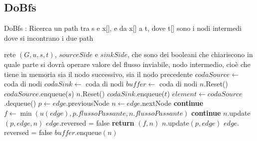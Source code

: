 \documentclass{article}
\begin{document}
\subsection{DoBfs}
\begin{algorithm}
    \caption{DoBfs : Ricerca un path tra s e x[], e da x[] a t, dove t[] sono i nodi intermedi dove si incontrano i due path}
    \begin{algorithmic}[1]
        \REQUIRE rete $(G,u,s,t)$, $sourceSide$ e $sinkSide$, che sono dei booleani che chiariscono in quale parte si dovrà operare
        \ENSURE valore del flusso inviabile, nodo intermedio, cioè che tiene in memoria sia il nodo successivo, sia il nodo precedente
        \STATE $codaSource \leftarrow$ coda di nodi
        \STATE $codaSink \leftarrow$ coda di nodi
        \STATE $buffer \leftarrow$ coda di nodi
        \STATE $n.$Reset()
        \ENDFOR
        \STATE $codaSource.$enqueue($s$)
        \ENDIF
        \STATE $n.$Reset()
        \ENDFOR
        \STATE $codaSink$.enqueue($t$)
        \ENDIF
        \STATE{}
        \STATE $element \leftarrow codaSource$.dequeue()
        \STATE $p \leftarrow edge.$previousNode
        \STATE $n \leftarrow edge.$nextNode
        \STATE \textbf{continue}
        \ELSE
        \STATE $f \leftarrow \min(u(edge),p.flussoPassante,n.flussoPassante)$
        \STATE \textbf{continue}
        \ENDIF
        \STATE $n.$update$(p,edge,n)$
        \STATE $edge.$reversed = false
        \STATE \textbf{return} $(f,n)$
        \ENDIF
        \ENDIF
        \STATE $n.$update$(p,edge)$
        \STATE $edge.$reversed = false
        \STATE $buffer$.enqueue$(n)$
        \ENDIF
    \end{algorithmic}
\end{algorithm}
\newpage
\end{document}
